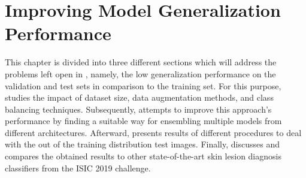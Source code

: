 \chapter{Improving Model Generalization Performance}
\label{chapter:experiments2}

This chapter is divided into three different sections which will address the problems left open in , namely, the low generalization performance on the validation and test sets in comparison to the training set. For this purpose,  studies the impact of dataset size, data augmentation methods, and class balancing techniques. Subsequently,  attempts to improve this approach's performance by finding a suitable way for ensembling multiple models from different architectures. Afterward,  presents results of different procedures to deal with the out of the training distribution test images. Finally,  discusses and compares the obtained results to other state-of-the-art skin lesion diagnosis classifiers from the \ac{ISIC} 2019 challenge. \par 

